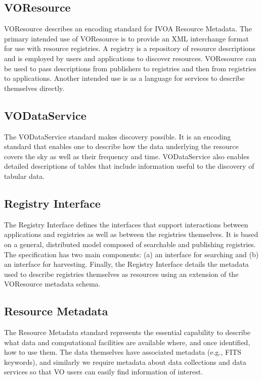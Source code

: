 \documentclass[11pt,letter]{ivoa}
\begin{document}
\subsection{VOResource}

VOResource \citep{2018ivoa.spec.0625P} describes an encoding standard
for IVOA Resource Metadata. The primary intended use of
VOResource is to provide an XML interchange format for use with resource
registries. A registry is
a repository of resource descriptions and is employed by users and
applications to discover resources.
VOResource can be used to pass descriptions from publishers to
registries and then from registries to
applications. Another intended use is as a language for services to
describe themselves directly.

\subsection{VODataService}

The VODataService \citep{2021ivoa.spec.1102D} standard makes discovery
possible. It is an encoding standard that enables one to
describe how the data underlying the resource covers the sky as well as
their frequency and time.
VODataService also enables detailed descriptions of tables that include
information useful to the
discovery of tabular data. 

\subsection{Registry Interface}

The Registry Interface \citep{2018ivoa.spec.0723D} defines the
interfaces that support interactions between applications and
registries as well as between the registries themselves. It is based on
a general, distributed
model composed of searchable and publishing registries. The
specification has two main components:
(a) an interface for searching and (b) an interface for harvesting.
Finally, the Registry Interface
details the metadata used to describe registries themselves as resources
using an extension of the
VOResource metadata schema.

\subsection{Resource Metadata}

The Resource Metadata \citep{2007ivoa.spec.0302H} standard represents
the essential capability to describe what data and
computational facilities are available where, and once identified, how
to use them. The data
themselves have associated metadata (e.g., FITS keywords), and similarly
we require metadata
about data collections and data services so that VO users can easily
find information of interest.
\end{document}
